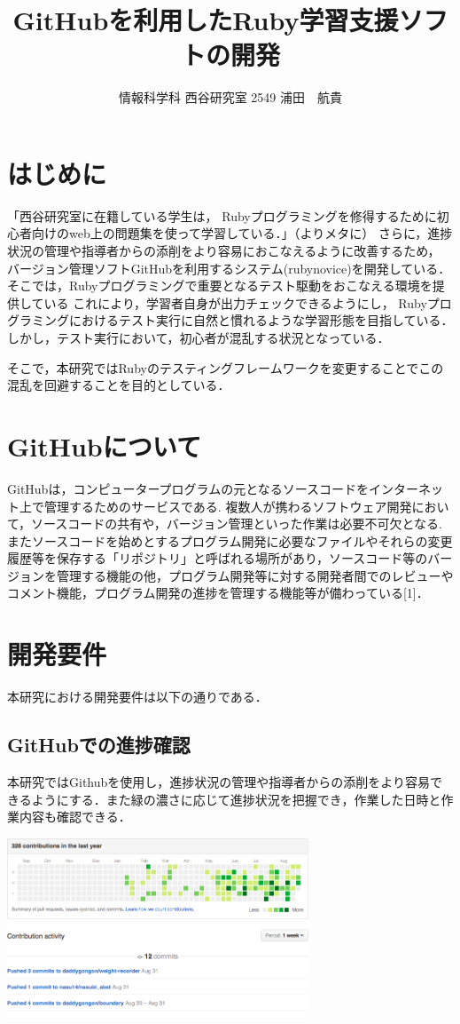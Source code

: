 \documentclass[a4j,twocolumn,uplatex]{jarticle}
\begin{document}
\title{GitHubを利用したRuby学習支援ソフトの開発}
\author{情報科学科 西谷研究室 2549 浦田　航貴}
\date{}
\maketitle
\section{はじめに}
「西谷研究室に在籍している学生は，
Rubyプログラミングを修得するために初心者向けのweb上の問題集を使って学習している．」（よりメタに）
さらに，進捗状況の管理や指導者からの添削をより容易におこなえるように改善するため，
バージョン管理ソフトGitHubを利用するシステム(rubynovice)を開発している．
そこでは，Rubyプログラミングで重要となるテスト駆動をおこなえる環境を提供している
これにより，学習者自身が出力チェックできるようにし，
Rubyプログラミングにおけるテスト実行に自然と慣れるような学習形態を目指している．
しかし，テスト実行において，初心者が混乱する状況となっている．

そこで，本研究ではRubyのテスティングフレームワークを変更することでこの混乱を回避することを目的としている．

\section{GitHubについて}%
GitHubは，コンピュータープログラムの元となるソースコードをインターネット上で管理するためのサービスである.
複数人が携わるソフトウェア開発において，ソースコードの共有や，バージョン管理といった作業は必要不可欠となる.
またソースコードを始めとするプログラム開発に必要なファイルやそれらの変更履歴等を保存する「リポジトリ」と呼ばれる場所があり，ソースコード等のバージョンを管理する機能の他，プログラム開発等に対する開発者間でのレビューやコメント機能，プログラム開発の進捗を管理する機能等が備わっている[1]．

\section{開発要件}
本研究における開発要件は以下の通りである．

\subsection{GitHubでの進捗確認}
本研究ではGithubを使用し，進捗状況の管理や指導者からの添削をより容易できるようにする．また緑の濃さに応じて進捗状況を把握でき，作業した日時と作業内容も確認できる．

\begin{center}
\includegraphics[width=9cm]{GitHub.jpg}
\end{center}
\end{document}
